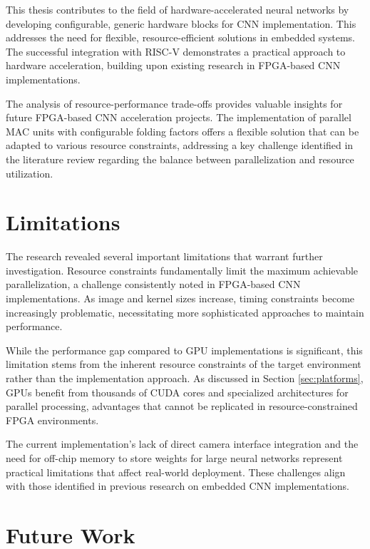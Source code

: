This thesis contributes to the field of hardware-accelerated neural networks by developing configurable, generic hardware blocks for CNN implementation. This addresses the need for flexible, resource-efficient solutions in embedded systems. The successful integration with RISC-V demonstrates a practical approach to hardware acceleration, building upon existing research in FPGA-based CNN implementations.

The analysis of resource-performance trade-offs provides valuable insights for future FPGA-based CNN acceleration projects. The implementation of parallel MAC units with configurable folding factors offers a flexible solution that can be adapted to various resource constraints, addressing a key challenge identified in the literature review regarding the balance between parallelization and resource utilization.

\section{Limitations}

The research revealed several important limitations that warrant further investigation. Resource constraints fundamentally limit the maximum achievable parallelization, a challenge consistently noted in FPGA-based CNN implementations. As image and kernel sizes increase, timing constraints become increasingly problematic, necessitating more sophisticated approaches to maintain performance.

While the performance gap compared to GPU implementations is significant, this limitation stems from the inherent resource constraints of the target environment rather than the implementation approach. As discussed in Section \ref{sec:platforms}, GPUs benefit from thousands of CUDA cores and specialized architectures for parallel processing, advantages that cannot be replicated in resource-constrained FPGA environments.

The current implementation's lack of direct camera interface integration and the need for off-chip memory to store weights for large neural networks represent practical limitations that affect real-world deployment. These challenges align with those identified in previous research on embedded CNN implementations.

\section{Future Work}

